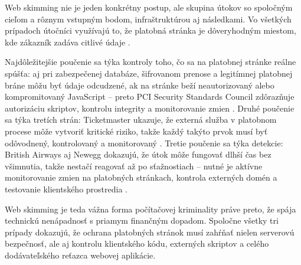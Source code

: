 Web skimming nie je jeden konkrétny postup, ale skupina útokov so spoločným cieľom a rôznym vstupným bodom, infraštruktúrou aj následkami. Vo všetkých prípadoch útočníci využívajú to, že platobná stránka je dôveryhodným miestom, kde zákazník zadáva citlivé údaje \cite{cisa2020eskimming,owaspThirdPartyJavascript,pciSsc2025PaymentPage}.

Najdôležitejšie poučenie sa týka kontroly toho, čo sa na platobnej stránke reálne spúšťa: aj pri zabezpečenej databáze, šifrovanom prenose a legitímnej platobnej bráne môžu byť údaje odcudzené, ak na stránke beží neautorizovaný alebo kompromitovaný JavaScript -- preto PCI Security Standards Council zdôrazňuje autorizáciu skriptov, kontrolu integrity a monitorovanie zmien \cite{pciSsc2025PaymentPage}. Druhé poučenie sa týka tretích strán: Ticketmaster ukazuje, že externá služba v platobnom procese môže vytvoriť kritické riziko, takže každý takýto prvok musí byť odôvodnený, kontrolovaný a monitorovaný \cite{owaspThirdPartyJavascript,ico2020Ticketmaster,owaspClientSideTop10}. Tretie poučenie sa týka detekcie: British Airways aj Newegg dokazujú, že útok môže fungovať dlhší čas bez všimnutia, takže nestačí reagovať až po sťažnostiach -- nutné je aktívne monitorovanie zmien na platobných stránkach, kontrola externých domén a testovanie klientského prostredia \cite{simmons2020BritishAirwaysPenalty,volexity2018Newegg}.

Web skimming je teda vážna forma počítačovej kriminality práve preto, že spája technickú nenápadnosť s priamym finančným dopadom. Spoločne všetky tri prípady dokazujú, že ochrana platobných stránok musí zahŕňať nielen serverovú bezpečnosť, ale aj kontrolu klientského kódu, externých skriptov a celého dodávateľského reťazca webovej aplikácie.
